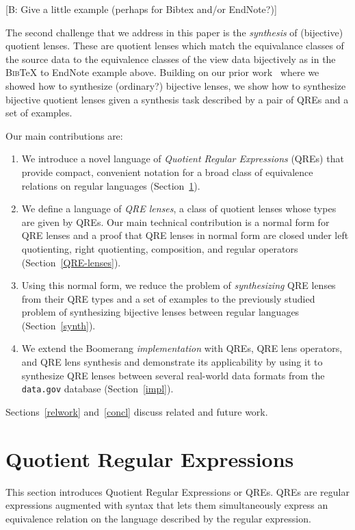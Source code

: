 \documentclass{svproc}
\newcommand{\FINISH}[3]{\ifdraft\textcolor{#1}{[#2: #3]}\fi}
\newcommand{\bcp}[1]{\FINISH{dkred}{B}{#1}}
\begin{document}
\bcp{Give a little example (perhaps for Bibtex and/or EndNote?)}

The second challenge that we address in this paper is the {\em synthesis} of
(bijective) quotient lenses. These are quotient lenses which match the
equivalance classes of the source data to the equivalence classes of the view
data bijectively as in the \textsc{Bib}\TeX{} to EndNote example above. 
Building on our prior work~\cite{popl18} where we showed how to synthesize
(ordinary?) bijective lenses, we show how to synthesize bijective quotient
lenses given a synthesis task described by a pair of QREs and a set of
examples. 

Our main contributions are:
\begin{enumerate}
\item We introduce a novel language of {\em Quotient Regular Expressions}
(QREs) that provide compact, convenient notation for a broad class of
equivalence relations on regular languages (Section~\ref{QRE}).
\item We define a language of {\em QRE lenses}, a class of quotient lenses
whose types are given by QREs.  Our main technical contribution is a normal
form for QRE lenses and a proof that QRE lenses in normal form are closed
under left quotienting, right quotienting, composition, and regular
operators (Section~\ref{QRE-lenses}).
\item Using this normal form, we reduce the problem of {\em synthesizing}
QRE lenses from their QRE types and a set of examples to the previously studied
problem of synthesizing bijective lenses between regular languages 
(Section~\ref{synth}).
\item We extend the Boomerang {\em implementation} with QREs, QRE lens operators,
and QRE lens synthesis and demonstrate its applicability by using it to
synthesize QRE lenses between several real-world data formats from the
{\tt data.gov} database (Section~\ref{impl}).
\end{enumerate}
Sections~\ref{relwork} and~\ref{concl} discuss related and future work.

\section{Quotient Regular Expressions}
\label{QRE}

This section introduces Quotient Regular Expressions or QREs. QREs are regular
expressions augmented with syntax that lets them simultaneously express an
equivalence relation on the language described by the regular expression.
\end{document}
